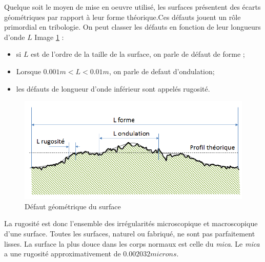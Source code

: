 Quelque soit le moyen de mise en oeuvre utilisé, les surfaces présentent des écarts
géométriques par rapport à leur forme théorique.Ces défauts jouent un rôle primordial en tribologie. On peut classer les défauts en fonction de leur longueurs d’onde $L$ Image \ref{fig:ondulation}  \cite{initiation} :
\begin{itemize}
	\item si $L$ est de l’ordre de la taille de la surface, on parle de défaut de forme ;
	\item Lorsque $0.001m < L < 0.01m$, on parle de defaut d'ondulation;
	\item les défauts de longueur d’onde inférieur sont appelés rugosité.
\end{itemize}
\begin{figure}
	\centering
	\includegraphics[width=0.7\linewidth]{Img/ondulation}
	\caption[Défaut géométrique du surfacee]{Défaut géométrique du surface}
	\label{fig:ondulation}
\end{figure}
La rugosité est donc l'ensemble des irrégularités microscopique et macroscopique d'une surface.
Toutes les surfaces, naturel ou fabriqué, ne sont pas parfaitement lisses. La surface la plus
douce dans les corps normaux est celle du \emph{mica}. Le \emph{mica} a une rugosité approximativement de $0.002032 microns$.\cite{ayad1}
